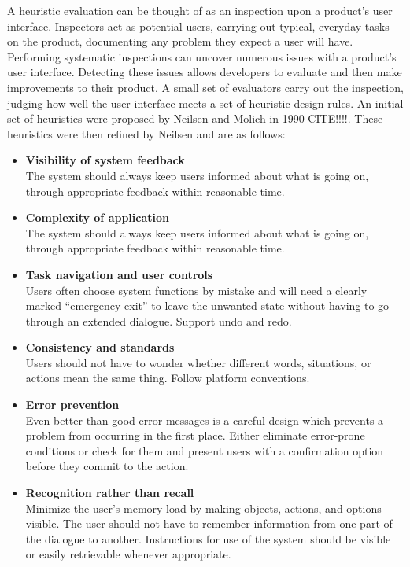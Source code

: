 \documentclass[11pt,a4paper]{article}
\begin{document}
A heuristic evaluation can be thought of as an inspection upon a product's user interface. Inspectors act as potential users, carrying out typical, everyday tasks on the product, documenting any problem they expect a user will have. Performing systematic inspections can uncover numerous issues with a product's user interface. Detecting these issues allows developers to evaluate and then make improvements to their product. A small set of evaluators carry out the inspection, judging how well the user interface meets a set of heuristic design rules. An initial set of heuristics were proposed by Neilsen and Molich in 1990 CITE!!!!. These heuristics were then refined by Neilsen and are as follows:

\begin{itemize}
  \item \textbf{Visibility of system feedback}\\ The system should always keep users informed about what is going on, through
  appropriate feedback within reasonable time.
  \item \textbf{Complexity of application}\\ The system should always keep users informed about what is going on, through  appropriate feedback within reasonable time.
  \item \textbf{Task navigation and user controls}\\ Users often choose system functions by mistake and will need a clearly marked
  ``emergency exit'' to leave the unwanted state without having to go through an extended dialogue. Support undo and redo.
  \item \textbf{Consistency and standards}\\ Users should not have to wonder whether different words, situations, or actions mean the same thing. Follow platform conventions.
  \item \textbf{Error prevention}\\ Even better than good error messages is a careful design which prevents a problem from occurring in the first place. Either eliminate error-prone conditions or check for them and present users with a confirmation option before they commit to the action.
  \item \textbf{Recognition rather than recall}\\ Minimize the user's memory load by making objects, actions, and options visible. The user should not have to remember information from one part of the dialogue to another. Instructions for use of the system should be visible or easily retrievable whenever appropriate.

\end{itemize}
\end{document}
